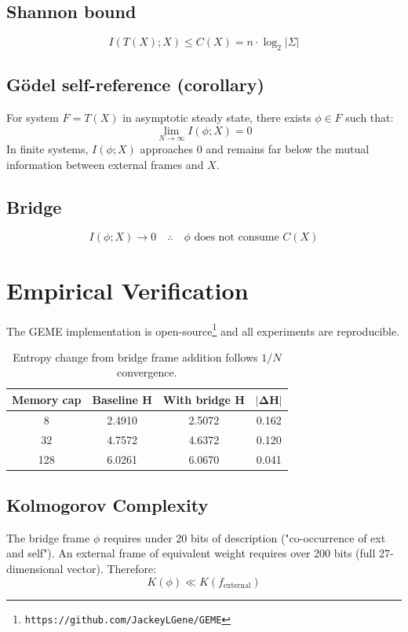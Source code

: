 \documentclass[11pt]{article}
\begin{document}
\subsection{Shannon bound}
\[
I(T(X); X) \leq C(X) = n \cdot \log_2|\Sigma|
\]

\subsection{G\"odel self-reference (corollary)}
For system $F = T(X)$ in asymptotic steady state, there exists $\phi \in F$ such that:
\[
\lim_{N \to \infty} I(\phi; X) = 0
\]
In finite systems, $I(\phi; X)$ approaches 0 and remains far below the mutual information between external frames and $X$.

\subsection{Bridge}
\[
I(\phi; X) \to 0 \quad \therefore \quad \phi \text{ does not consume } C(X)
\]

\section{Empirical Verification}

The GEME implementation is open-source\footnote{\texttt{https://github.com/JackeyLGene/GEME}} and all experiments are reproducible.

\begin{table}[h]
\centering
\begin{tabular}{|c|c|c|c|}
\hline
\textbf{Memory cap} & \textbf{Baseline H} & \textbf{With bridge H} & $\mathbf{|\Delta H|}$ \\
\hline
8  & 2.4910 & 2.5072 & 0.162 \\
32 & 4.7572 & 4.6372 & 0.120 \\
128 & 6.0261 & 6.0670 & 0.041 \\
\hline
\end{tabular}
\caption{Entropy change from bridge frame addition follows $1/N$ convergence.}
\end{table}

\subsection{Kolmogorov Complexity}
The bridge frame $\phi$ requires under 20 bits of description ("co-occurrence of ext and self"). An external frame of equivalent weight requires over 200 bits (full 27-dimensional vector). Therefore:
\[
K(\phi) \ll K(f_{\text{external}})
\]
\end{document}
